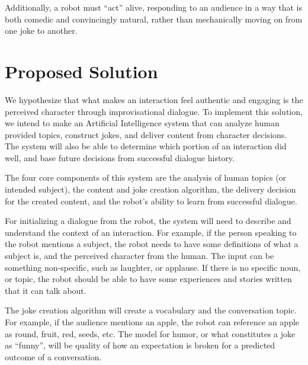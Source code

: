 \documentclass[onecolumn, draftclsnofoot,10pt, compsoc]{IEEEtran}
\begin{document}
Additionally, a robot must “act” alive, responding to an audience in a way that is both comedic and convincingly natural, rather than mechanically moving on from one joke to another.







\section{Proposed Solution}

We hypothesize that what makes an interaction feel authentic and engaging is the perceived character through improvisational dialogue. To implement this solution, we intend to make an Artificial Intelligence system that can analyze human provided topics, construct jokes, and deliver content from character decisions. The system will also be able to determine which portion of an interaction did well, and base future decisions from successful dialogue history.

The four core components of this system are the analysis of human topics (or intended subject), the content and joke creation algorithm, the delivery decision for the created content, and the robot's ability to learn from successful dialogue.

For initializing a dialogue from the robot, the system will need to describe and understand the context of an interaction. For example, if the person speaking to the robot mentions a subject, the robot needs to have some definitions of what a subject is,{ and the perceived character from the human}. The input can be something non-specific, such as laughter, or applause. If there is no specific noun, or topic, the robot should be able to have some experiences and stories written that it can talk about.

The joke creation algorithm will create a vocabulary and the conversation topic. For example, if the audience mentions an apple, the robot can reference an apple as round, fruit, red, seeds, etc. The model for humor, or what constitutes a joke as “funny”, will be quality of how an expectation is broken for a predicted outcome of a conversation. 
\end{document}
